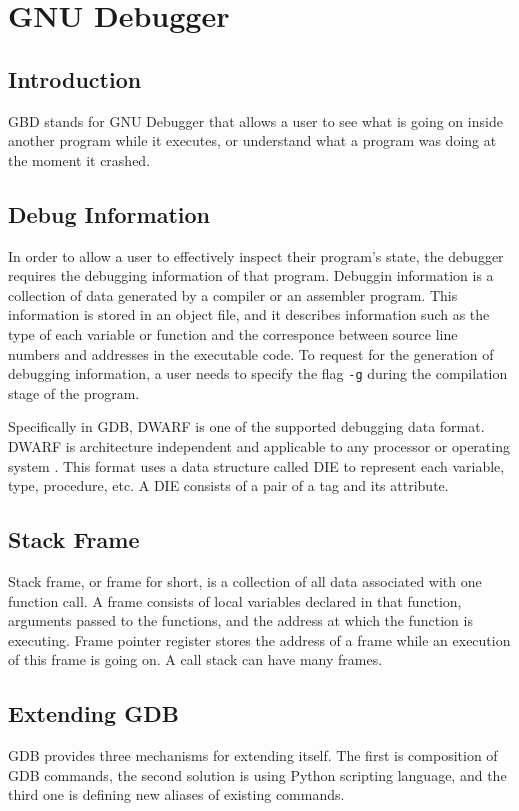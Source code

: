 \chapter{GNU Debugger} \label{GDB}

\section{Introduction}
GBD stands for GNU Debugger that allows a user to see what is going on
inside another program while it executes, or understand what a program was
doing at the moment it crashed\cite{reference3}.

\section{Debug Information}
In order to allow a user to effectively inspect their program's state, the
debugger requires the debugging information of that program. Debuggin
information is a collection of data generated by a compiler or an assembler
program. This information is stored in an object file, and it describes
information such as the type of each variable or function and
the corresponce between source line numbers and addresses in the executable
code\cite{reference6}. To request for the generation of debugging information,
a user needs to specify the flag \verb|-g| during the compilation stage of the
program.

Specifically in GDB, DWARF is one of the supported debugging data format. DWARF is architecture
independent and applicable to any processor or operating system
\cite{reference7}. This format uses a data structure called DIE to represent
each variable, type, procedure, etc. A DIE consists of a pair of a tag
and its attribute\cite{reference8}.

\section{Stack Frame}
Stack frame, or frame for short, is a collection of all data associated with
one function call. A frame consists of local variables declared in that
function, arguments passed to the functions, and the address at which the
function is executing. Frame pointer register stores the address of a frame
while an execution of this frame is going on. A call stack can have many
frames\cite{reference}.

\section{Extending GDB}
GDB provides three mechanisms for extending itself. The first is
composition of GDB commands, the second solution is using Python scripting
language, and the third one is defining new aliases of existing commands.

